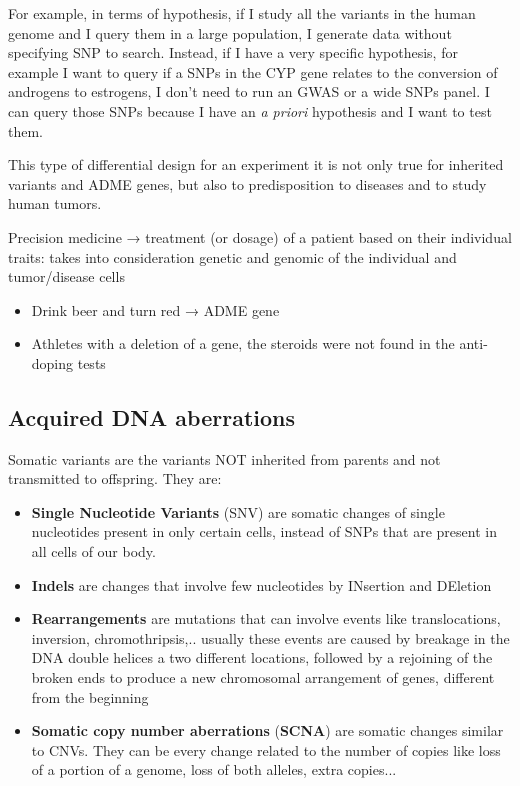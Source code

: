 For example, in terms of hypothesis, if I study all the variants in the human
genome and I query them in a large population, I generate data without
specifying SNP to search. Instead, if I have a very specific hypothesis, for
example I want to query if a SNPs in the CYP gene relates to the conversion of
androgens to estrogens, I don't need to run an GWAS or a wide SNPs panel. I can
query those SNPs because I have an \emph{a priori} hypothesis and I want to test
them.

This type of differential design for an experiment it is not only true for
inherited variants and ADME genes, but also to predisposition to diseases and to
study human tumors.

Precision medicine → treatment (or dosage) of a patient based on their
individual traits: takes into consideration genetic and genomic of the
individual and tumor/disease cells

\begin{itemize}
  \item Drink beer and turn red → ADME gene
  \item Athletes with a deletion of a gene, the steroids were not found in the
  anti-doping tests
\end{itemize}
 

\hypertarget{acquired-dna-aberrations}{%
\subsection{Acquired DNA aberrations}\label{acquired-dna-aberrations}}


Somatic variants are the variants NOT inherited from parents and not transmitted
to offspring. They are:

\begin{itemize}
  \item \textbf{Single Nucleotide Variants} (SNV) are somatic changes of single
  nucleotides present in only certain cells, instead of SNPs that are present in
  all cells of our body.
  \item \textbf{Indels} are changes that involve few nucleotides by INsertion
  and DEletion
  \item \textbf{Rearrangements} are mutations that can involve events like
translocations, inversion, chromothripsis,.. usually these events are caused by
breakage in the DNA double helices a two different locations, followed by a
rejoining of the broken ends to produce a new chromosomal arrangement of genes,
different from the beginning

  \item \textbf{Somatic copy number aberrations} (\textbf{SCNA}) are somatic
changes similar to CNVs. They can be every change related to the number of
copies like loss of a portion of a genome, loss of both alleles, extra copies...
\end{itemize}

